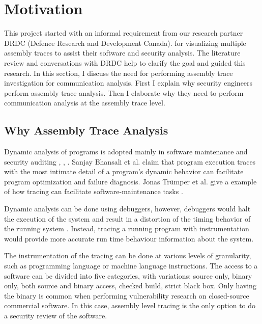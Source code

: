\section{Motivation}
This project started with an informal requirement from our research partner DRDC (Defence Research and Development Canada). for visualizing multiple assembly traces to assist their software and security analysis. The literature review and conversations with DRDC help to clarify the goal and guided this research. In this section, I discuss the need for performing assembly trace investigation for communication analysis. First I explain why security engineers perform assembly trace analysis. Then I elaborate why they need to perform communication analysis at the assembly trace level. 

\subsection{Why Assembly Trace Analysis}
Dynamic analysis of programs is adopted mainly in software maintenance and security auditing \cite{zhang2010detecting}, \cite{cai2016sworddta}, \cite{somorovsky2016systematic}. Sanjay Bhansali et al. claim that program execution traces with the most intimate detail of a program's dynamic behavior can facilitate program optimization and failure diagnosis. Jonas Tr{\"u}mper et al. give a example of how tracing can facilitate software-maintenance tasks \cite{trumper2012maintenance}.

Dynamic analysis can be done using debuggers, however, debuggers would halt the execution of the system and result in a distortion of the timing behavior of the running system \cite{trumper2012maintenance}. Instead, tracing a running program with instrumentation would provide more accurate run time behaviour information about the system. 

The instrumentation of the tracing can be done at various levels of granularity, such as programming language or machine language instructions. The access to a software can be divided into five categories, with variations: source only, binary only, both source and binary access, checked build, strict black box. Only having the binary is common when performing vulnerability research on closed-source commercial software\cite{dowd_art_2006}. In this case, assembly level tracing is the only option to do a security review of the software.

